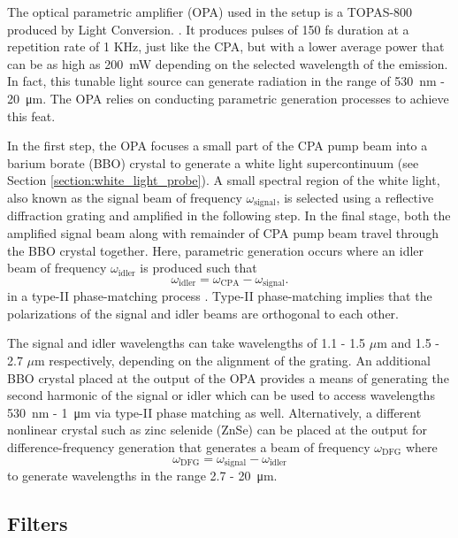 The optical parametric amplifier (OPA) used in the setup is a TOPAS-800 produced by Light Conversion. \cite{topas}. It produces pulses of 150 fs duration at a repetition rate of 1 KHz, just like the CPA, but with a lower average power that can be as high as \SI{200}{\milli\watt} depending on the selected wavelength of the emission. In fact, this tunable light source can generate radiation in the range of \SI{530}{\nano\meter} - \SI{20}{\micro\meter}. The OPA relies on conducting parametric generation processes to achieve this feat. 

In the first step, the OPA focuses a small part of the CPA pump beam into a barium borate (BBO) crystal to generate a white light supercontinuum (see Section \ref{section:white_light_probe}). A small spectral region of the white light, also known as the signal beam of frequency $\omega_\text{signal}$, is selected using a reflective diffraction grating and amplified in the following step. In the final stage, both the amplified signal beam along with remainder of CPA pump beam travel through the BBO crystal together. Here, parametric generation occurs where an idler beam of frequency $\omega_\text{idler}$ is produced such that
\begin{equation}
	\omega_\text{idler} = \omega_\text{CPA} - \omega_\text{signal}.
\end{equation}
in a type-II phase-matching process \cite{dunn1999parametric}. Type-II phase-matching implies that the polarizations of the signal and idler beams are orthogonal to each other.

The signal and idler wavelengths can take wavelengths of 1.1 - 1.5 $\mu$m  and 1.5 - 2.7 $\mu$m respectively, depending on the alignment of the grating. An additional BBO crystal placed at the output of the OPA provides a means of generating the second harmonic of the signal or idler which can be used to access wavelengths \SI{530}{nm} - \SI{1}{\micro \meter} via type-II phase matching as well. Alternatively, a different nonlinear crystal such as zinc selenide (ZnSe) can be placed at the output for difference-frequency generation that generates a beam of frequency $\omega_\text{DFG}$ where
\begin{equation}
	\omega_\text{DFG} = \omega_\text{signal} - \omega_\text{idler}
\end{equation}
to generate wavelengths in the range 2.7 - \SI{20}{\micro\meter}.
\subsection{Filters}

